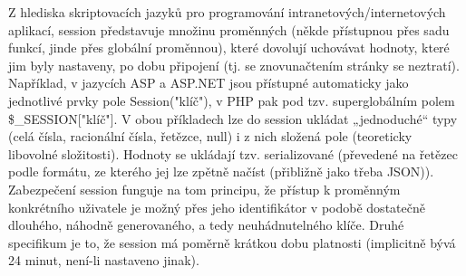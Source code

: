 \documentclass[10pt,a4paper]{article}
\begin{document}
Z hlediska skriptovacích jazyků pro programování intranetových/internetových aplikací, session představuje množinu proměnných (někde přístupnou přes sadu funkcí, jinde přes globální proměnnou), které dovolují uchovávat hodnoty, které jim byly nastaveny, po dobu připojení (tj. se znovunačtením stránky se neztratí). Například, v jazycích ASP a ASP.NET jsou přístupné automaticky jako jednotlivé prvky pole Session("klíč"), v PHP pak pod tzv. superglobálním polem \$\_SESSION["klíč"]. V obou příkladech lze do session ukládat „jednoduché“ typy (celá čísla, racionální čísla, řetězce, null) i z nich složená pole (teoreticky libovolné složitosti). Hodnoty se ukládají tzv. serializované (převedené na řetězec podle formátu, ze kterého jej lze zpětně načíst (přibližně jako třeba JSON)). \\
Zabezpečení session funguje na tom principu, že přístup k proměnným konkrétního uživatele je možný přes jeho identifikátor v podobě dostatečně dlouhého, náhodně generovaného, a tedy neuhádnutelného klíče. Druhé specifikum je to, že session má poměrně krátkou dobu platnosti (implicitně bývá 24 minut, není-li nastaveno jinak).
\end{document}
